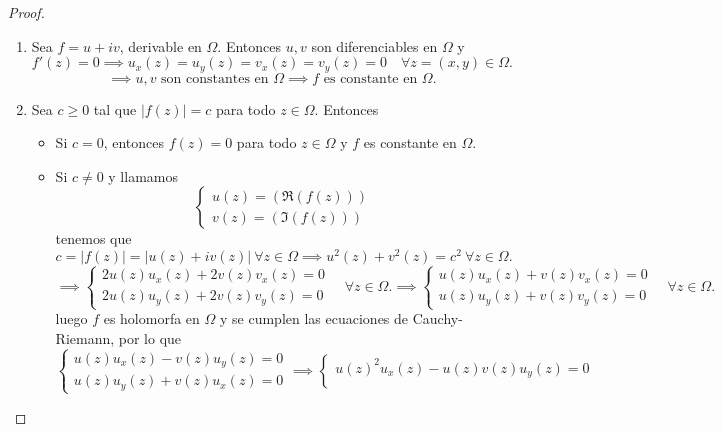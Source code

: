 \begin{proof}
    \leavevmode
    \begin{enumerate}
        \item Sea $f = u + iv$, derivable en $\Omega$. Entonces $u, v$ son diferenciables en $\Omega$ y 
        \[
            f'(z) = 0 \implies u_x(z) = u_y(z) = v_x(z) = v_y(z) = 0 \quad \forall z = (x,y) \in \Omega.
        \]
        \[
            \implies u, v \text{ son constantes en } \Omega \implies f \text{ es constante en } \Omega.
        \]
        \item Sea $c \geq 0$ tal que $|f(z)| = c$ para todo $z \in \Omega$. Entonces
        \begin{itemize}
            \item Si $c=0$, entonces $f(z) = 0$ para todo $z \in \Omega$ y $f$ es constante en $\Omega$.
            \item Si $c \neq 0$ y llamamos 
            \[
                \begin{cases}
                    u(z) = (\Re(f(z))) \\
                    v(z) = (\Im(f(z)))
                \end{cases}
            \]
            tenemos que 
            \[
                c = |f(z)| = |u(z) + iv(z)| \ \forall z \in \Omega \implies u^2(z) + v^2(z) = c^2 \ \forall z \in \Omega.
            \]
            \[
                \implies \begin{cases}
                    2u(z) u_x(z) + 2v(z) v_x(z) = 0 \\
                    2u(z) u_y(z) + 2v(z) v_y(z) = 0
                \end{cases} \quad \forall z \in \Omega. \implies
                \begin{cases}
                    u(z) u_x(z) + v(z) v_x(z) = 0 \\
                    u(z) u_y(z) + v(z) v_y(z) = 0
                \end{cases} \quad \forall z \in \Omega.
            \]
            luego $f$ es holomorfa en $\Omega$ y se cumplen las ecuaciones de Cauchy-Riemann, por lo que
            \[
                \begin{cases}
                    u(z) u_x(z) - v(z) u_y(z) = 0 \\
                    u(z) u_y(z) + v(z) u_x(z) = 0
                \end{cases} \implies 
                \begin{cases}
                    u(z)^2 u_x(z) - u(z) v(z) u_y(z) = 0 \\

\end{cases}\]
\end{itemize}
\end{enumerate}
\end{proof}
